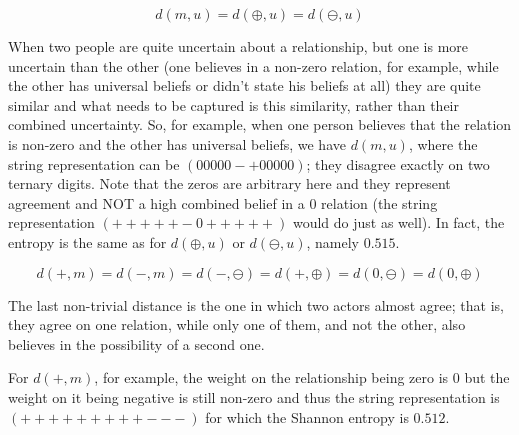 \documentclass[12pt]{article}
\begin{document}
$$d(m, u)=d(\oplus, u)=d(\ominus, u)$$

When two people are quite uncertain about a relationship, but one is more uncertain than the other (one believes in a non-zero relation, for example, while the other has universal beliefs or didn't state his beliefs at all) they are quite similar and what needs to be captured is this similarity, rather than their combined uncertainty. So, for example, when one person believes that the relation is non-zero and the other has universal beliefs, we have $d(m, u)$, where the string representation can be $(00000-+00000)$; they disagree exactly on two ternary digits. Note that the zeros are arbitrary here and they represent agreement and NOT a high combined belief in a $0$ relation (the string representation $(+++++-0+++++)$ would do just as well). In fact, the entropy is the same as for $d(\oplus, u)$ or $d(\ominus, u)$, namely $0.515$.
 
$$d(+, m)= d(-, m)=d(-, \ominus)=d(+, \oplus)=d(0, \ominus)=d(0, \oplus)$$

The last non-trivial distance is the one in which two actors almost agree; that is, they agree on one relation, while only one of them, and not the other, also believes in the possibility of a second one. 

For $d(+, m)$, for example, the weight on the relationship being zero is $0$ but the weight on it being negative is still non-zero and thus the string representation is $(+++++++++---)$ for which the Shannon entropy is $0.512$.


   
\end{document}
